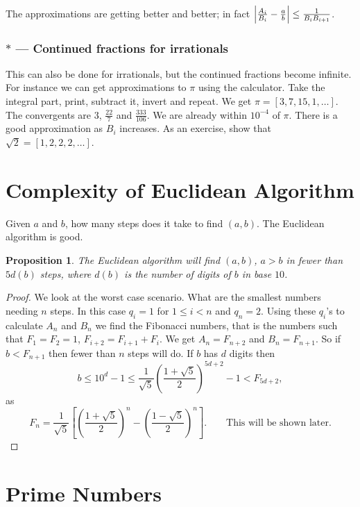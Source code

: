 \documentclass{notes}
\theoremstyle{plain}
\newtheorem*{proposition}{Proposition}
\begin{document}
The approximations are getting better and better; in fact
$\left|\frac{A_i}{B_i} - \frac{a}{b}\right| \le \frac{1}{B_i B_{i+1}}$.

\subsubsection*{$\ast$ --- Continued fractions for irrationals}

This can also be done for irrationals, but the continued fractions become
infinite.  For instance we can get approximations to $\pi$ using the
calculator.  Take the integral part, print, subtract it, invert and repeat.
We get $\pi = [3,7,15,1,\dots ]$.  The convergents are
$3$, $\frac{22}{7}$ and $\frac{333}{106}$.  We are already within $10^{-4}$
of $\pi$.  There is a good approximation as $B_i$ increases.
As an exercise, show that $\sqrt{2} = [1,2,2,2,\dots]$.

\section{Complexity of Euclidean Algorithm}

Given $a$ and $b$, how many steps does it take to find $(a,b)$.  The
Euclidean algorithm is good.

\begin{proposition}
The Euclidean algorithm will find $(a,b)$, $a>b$ in fewer than
$5 d(b)$ steps, where $d(b)$ is the number of digits of $b$ in base $10$.
\end{proposition}

\begin{proof}
We look at the worst case scenario.  What are the smallest numbers needing
$n$ steps.  In this case $q_i = 1$ for $1 \le i < n$ and $q_n = 2$.  Using
these $q_i$'s to calculate $A_n$ and $B_n$ we find the Fibonacci numbers,
that is the numbers such that $F_1 = F_2 = 1$, $F_{i+2} = F_{i+1} + F_i$.
We get $A_n = F_{n+2}$ and $B_n = F_{n+1}$.  So if $b < F_{n+1}$ then
fewer than $n$ steps will do.  If $b$ has $d$ digits then
\[
b \le 10^d -1 \le \frac{1}{\sqrt{5}} \left( \frac{1 + \sqrt{5}}{2}
\right)^{5 d + 2} -1 < F_{5 d + 2},
\]
as
\[
F_n = \frac{1}{\sqrt{5}} \left[
\left(\frac{1 + \sqrt{5}}{2}\right)^n -
\left(\frac{1 - \sqrt{5}}{2}\right)^n
\right]. \qquad \text{This will be shown later.}
\]
\end{proof}

\section{Prime Numbers}
\end{document}
